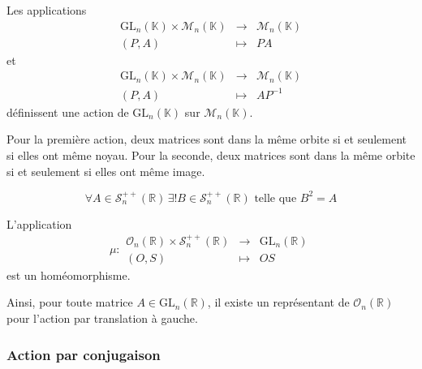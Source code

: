 
  \begin{proposition}
    Les applications
    \[
    \begin{array}{ccc}
      \mathrm{GL}_n(\mathbb{K}) \times \mathcal{M}_n(\mathbb{K}) &\rightarrow& \mathcal{M}_n(\mathbb{K}) \\
      (P, A) &\mapsto& PA
    \end{array}
    \]
    et
    \[
    \begin{array}{ccc}
      \mathrm{GL}_n(\mathbb{K}) \times \mathcal{M}_n(\mathbb{K}) &\rightarrow& \mathcal{M}_n(\mathbb{K}) \\
      (P, A) &\mapsto& AP^{-1}
    \end{array}
    \]
    définissent une action de $\mathrm{GL}_n(\mathbb{K})$ sur $\mathcal{M}_n(\mathbb{K})$.
  \end{proposition}

  \begin{remark}
    Pour la première action, deux matrices sont dans la même orbite si et seulement si elles ont même noyau. Pour la seconde, deux matrices sont dans la même orbite si et seulement si elles ont même image.
  \end{remark}


  \begin{lemma}
    \[ \forall A \in \mathcal{S}_n^{++}(\mathbb{R}) \, \exists! B \in \mathcal{S}_n^{++}(\mathbb{R}) \text{ telle que } B^2 = A \]
  \end{lemma}


  \begin{theorem}
    L'application
    \[ \mu :
    \begin{array}{ccc}
      \mathcal{O}_n(\mathbb{R}) \times \mathcal{S}_n^{++}(\mathbb{R}) &\rightarrow& \mathrm{GL}_n(\mathbb{R}) \\
      (O, S) &\mapsto& OS
    \end{array}
    \]
    est un homéomorphisme.
  \end{theorem}

  \begin{remark}
    Ainsi, pour toute matrice $A \in \mathrm{GL}_n(\mathbb{R})$, il existe un représentant de $\mathcal{O}_n(\mathbb{R})$ pour l'action par translation à gauche.
  \end{remark}

  \subsubsection{Action par conjugaison}


